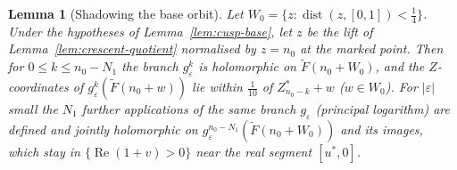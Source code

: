 \documentclass[11pt]{amsart}
\newtheorem{lemma}[theorem]{Lemma}
\theoremstyle{definition}
\begin{document}
\begin{lemma}[Shadowing the base orbit]\label{lem:cusp-shadow}
Let $W_0=\{z:\operatorname{dist}(z,[0,1])<\tfrac14\}$.  Under the hypotheses of
Lemma~\ref{lem:cusp-base}, let $z$ be the lift of Lemma~\ref{lem:crescent-quotient}
normalised by $z=n_0$ at the marked point.  Then for $0\le k\le n_0-N_1$ the
branch $g_\varepsilon^{k}$ is holomorphic on $\tilde F(n_0+W_0)$, and the $Z$-coordinates
of $g_\varepsilon^k(\tilde F(n_0+w))$ lie within $\tfrac1{10}$ of $Z^*_{n_0-k}+w$ ($w\in W_0$).
For $|\varepsilon|$ small the $N_1$ further applications of the same branch $g_\varepsilon$
(principal logarithm) are defined and jointly holomorphic on
$g_\varepsilon^{n_0-N_1}(\tilde F(n_0+W_0))$ and its images, which stay in
$\{\operatorname{Re}(1+v)>0\}$ near the real segment $[u^*,0]$.
\end{lemma}
\end{document}
